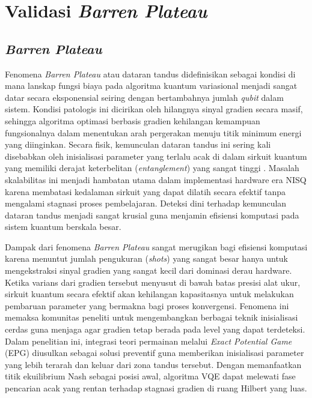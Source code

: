 \section{Validasi \textit{Barren Plateau}}

\subsection{\textit{Barren Plateau}}
Fenomena \textit{Barren Plateau} atau dataran tandus didefinisikan sebagai kondisi di mana lanskap fungsi biaya pada algoritma kuantum variasional menjadi sangat datar secara eksponensial seiring dengan bertambahnya jumlah \textit{qubit} dalam sistem. Kondisi patologis ini dicirikan oleh hilangnya sinyal gradien secara masif, sehingga algoritma optimasi berbasis gradien kehilangan kemampuan fungsionalnya dalam menentukan arah pergerakan menuju titik minimum energi yang diinginkan. Secara fisik, kemunculan dataran tandus ini sering kali disebabkan oleh inisialisasi parameter yang terlalu acak di dalam sirkuit kuantum yang memiliki derajat keterbelitan (\textit{entanglement}) yang sangat tinggi \cite{mcclean_2018}. Masalah skalabilitas ini menjadi hambatan utama dalam implementasi hardware era NISQ karena membatasi kedalaman sirkuit yang dapat dilatih secara efektif tanpa mengalami stagnasi proses pembelajaran. Deteksi dini terhadap kemunculan dataran tandus menjadi sangat krusial guna menjamin efisiensi komputasi pada sistem kuantum berskala besar.

Dampak dari fenomena \textit{Barren Plateau} sangat merugikan bagi efisiensi komputasi karena menuntut jumlah pengukuran (\textit{shots}) yang sangat besar hanya untuk mengekstraksi sinyal gradien yang sangat kecil dari dominasi derau hardware. Ketika varians dari gradien tersebut menyusut di bawah batas presisi alat ukur, sirkuit kuantum secara efektif akan kehilangan kapasitasnya untuk melakukan pembaruan parameter yang bermakna bagi proses konvergensi. Fenomena ini memaksa komunitas peneliti untuk mengembangkan berbagai teknik inisialisasi cerdas guna menjaga agar gradien tetap berada pada level yang dapat terdeteksi. Dalam penelitian ini, integrasi teori permainan melalui \textit{Exact Potential Game} (EPG) diusulkan sebagai solusi preventif guna memberikan inisialisasi parameter yang lebih terarah dan keluar dari zona tandus tersebut. Dengan memanfaatkan titik ekuilibrium Nash sebagai posisi awal, algoritma VQE dapat melewati fase pencarian acak yang rentan terhadap stagnasi gradien di ruang Hilbert yang luas.

